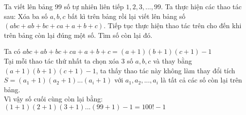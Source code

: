 \begin{ex}%
    Ta viết lên bảng $99$ số tự nhiên liên tiếp $1,2,3,...,99$. Ta thực hiện các thao tác sau: Xóa ba số $a,b,c$ bất kì trên bảng rồi lại viết lên bảng số $(abc+ab+bc+ca+a+b+c)$. Tiếp tục thực hiện thao tác trên cho đến khi trên bảng còn lại đúng một số. Tìm số còn lại đó.
\loigiai
    {Ta có $abc+ab+bc+ca+a+b+c=(a+1)(b+1)(c+1)-1$\\
    Tại mỗi thao tác thứ nhất ta chọn xóa $3$ số $a,b,c$ và thay bằng $(a+1)(b+1)(c+1)-1$, ta thấy thao tác này không làm thay đổi tích $S=(a_1+1)(a_2+1)...(a_i+1)$ với $a_1,a_2,...,a_i$ là tất cả các số còn lại trên bảng.\\
    Vì vậy số cuối cùng còn lại bằng: $(1+1)(2+1)(3+1)...(99+1)-1=100!-1$
    
    }
\end{ex}

